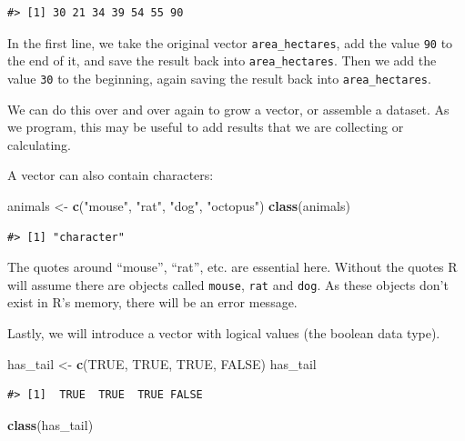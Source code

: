 \documentclass[
]{book}
\newenvironment{Shaded}{\begin{snugshade}}{\end{snugshade}}
\newcommand{\ConstantTok}[1]{\textcolor[rgb]{0.56,0.35,0.01}{#1}}
\newcommand{\FunctionTok}[1]{\textcolor[rgb]{0.13,0.29,0.53}{\textbf{#1}}}
\newcommand{\NormalTok}[1]{#1}
\newcommand{\OtherTok}[1]{\textcolor[rgb]{0.56,0.35,0.01}{#1}}
\newcommand{\StringTok}[1]{\textcolor[rgb]{0.31,0.60,0.02}{#1}}
\begin{document}
\begin{verbatim}
#> [1] 30 21 34 39 54 55 90
\end{verbatim}

In the first line, we take the original vector \texttt{area\_hectares},
add the value \texttt{90} to the end of it, and save the result back into
\texttt{area\_hectares}. Then we add the value \texttt{30} to the beginning, again saving the result back into \texttt{area\_hectares}.

We can do this over and over again to grow a vector, or assemble a dataset.
As we program, this may be useful to add results that we are collecting or
calculating.

A vector can also contain characters:

\begin{Shaded}
\begin{Highlighting}[]
\NormalTok{animals }\OtherTok{\textless{}{-}} \FunctionTok{c}\NormalTok{(}\StringTok{"mouse"}\NormalTok{, }\StringTok{"rat"}\NormalTok{, }\StringTok{"dog"}\NormalTok{, }\StringTok{"octopus"}\NormalTok{)}
\FunctionTok{class}\NormalTok{(animals)}
\end{Highlighting}
\end{Shaded}

\begin{verbatim}
#> [1] "character"
\end{verbatim}

The quotes around ``mouse'', ``rat'', etc. are essential here. Without the quotes R
will assume there are objects called \texttt{mouse}, \texttt{rat} and \texttt{dog}. As these objects
don't exist in R's memory, there will be an error message.

Lastly, we will introduce a vector with logical values (the boolean data type).

\begin{Shaded}
\begin{Highlighting}[]
\NormalTok{has\_tail }\OtherTok{\textless{}{-}} \FunctionTok{c}\NormalTok{(}\ConstantTok{TRUE}\NormalTok{, }\ConstantTok{TRUE}\NormalTok{, }\ConstantTok{TRUE}\NormalTok{, }\ConstantTok{FALSE}\NormalTok{)}
\NormalTok{has\_tail }
\end{Highlighting}
\end{Shaded}

\begin{verbatim}
#> [1]  TRUE  TRUE  TRUE FALSE
\end{verbatim}

\begin{Shaded}
\begin{Highlighting}[]
\FunctionTok{class}\NormalTok{(has\_tail)}
\end{Highlighting}
\end{Shaded}
\end{document}
